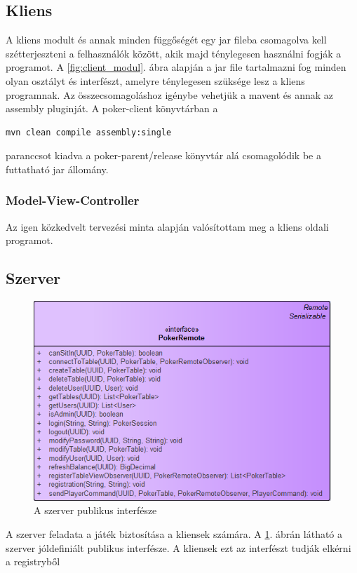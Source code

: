 \subsection{Kliens}
A kliens modult és annak minden függőségét egy jar fileba csomagolva kell szétterjeszteni a felhasználók között, akik majd ténylegesen használni fogják a programot. A \ref{fig:client_modul}. ábra alapján a jar file tartalmazni fog minden olyan osztályt és interfészt, amelyre ténylegesen szüksége lesz a kliens programnak. Az összecsomagoláshoz igénybe vehetjük a mavent és annak az assembly pluginját. A poker-client könyvtárban a
 \begin{verbatim}
mvn clean compile assembly:single
\end{verbatim}
paranccsot kiadva a poker-parent/release könyvtár alá csomagolódik be a futtatható jar állomány. \\
\subsubsection{Model-View-Controller \cite{MVC}}
Az igen közkedvelt tervezési minta alapján valósítottam meg a kliens oldali programot.








\subsection{Szerver}
\begin{figure}[h!]
  \caption{A szerver publikus interfésze}
  \label{fig:server_public}
  \centering
    \includegraphics[width=\textwidth]{user-documentation/images/server_remote.png}
\end{figure}
A szerver feladata a játék biztosítása a kliensek számára. A \ref{fig:server_public}. ábrán látható a szerver jóldefiniált publikus interfésze. A kliensek ezt az interfészt tudják elkérni a registryből \cite{RMI}

